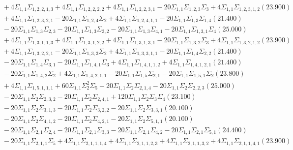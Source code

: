 \documentclass[12pt]{article}
\begin{document}
\begin{landscape}
\begin{align*}
		&\quad\quad +4\Sigma_{1,1}\Sigma_{1,2,2,1,3}+4\Sigma_{1,1}\Sigma_{1,2,2,2,2}+4\Sigma_{1,1}\Sigma_{1,2,2,3,1}-20\Sigma_{1,1}\Sigma_{1,2,3}\Sigma_{3}+4\Sigma_{1,1}\Sigma_{1,2,3,1,2}(23.900) \\ 
		&\quad\quad +4\Sigma_{1,1}\Sigma_{1,2,3,2,1}-20\Sigma_{1,1}\Sigma_{1,2,4}\Sigma_{2}+4\Sigma_{1,1}\Sigma_{1,2,4,1,1}-20\Sigma_{1,1}\Sigma_{1,3}\Sigma_{1,4}(21.400) \\ 
		&\quad\quad -20\Sigma_{1,1}\Sigma_{1,3}\Sigma_{2,3}-20\Sigma_{1,1}\Sigma_{1,3}\Sigma_{3,2}-20\Sigma_{1,1}\Sigma_{1,3}\Sigma_{4,1}-20\Sigma_{1,1}\Sigma_{1,3,1}\Sigma_{4}(25.000) \\ 
		&\quad\quad +4\Sigma_{1,1}\Sigma_{1,3,1,1,3}+4\Sigma_{1,1}\Sigma_{1,3,1,2,2}+4\Sigma_{1,1}\Sigma_{1,3,1,3,1}-20\Sigma_{1,1}\Sigma_{1,3,2}\Sigma_{3}+4\Sigma_{1,1}\Sigma_{1,3,2,1,2}(23.900) \\ 
		&\quad\quad +4\Sigma_{1,1}\Sigma_{1,3,2,2,1}-20\Sigma_{1,1}\Sigma_{1,3,3}\Sigma_{2}+4\Sigma_{1,1}\Sigma_{1,3,3,1,1}-20\Sigma_{1,1}\Sigma_{1,4}\Sigma_{2,2}(21.400) \\ 
		&\quad\quad -20\Sigma_{1,1}\Sigma_{1,4}\Sigma_{3,1}-20\Sigma_{1,1}\Sigma_{1,4,1}\Sigma_{3}+4\Sigma_{1,1}\Sigma_{1,4,1,1,2}+4\Sigma_{1,1}\Sigma_{1,4,1,2,1}(21.400) \\ 
		&\quad\quad -20\Sigma_{1,1}\Sigma_{1,4,2}\Sigma_{2}+4\Sigma_{1,1}\Sigma_{1,4,2,1,1}-20\Sigma_{1,1}\Sigma_{1,5}\Sigma_{2,1}-20\Sigma_{1,1}\Sigma_{1,5,1}\Sigma_{2}(23.800) \\ 
		&\quad\quad +4\Sigma_{1,1}\Sigma_{1,5,1,1,1}+60\Sigma_{1,1}\Sigma_{2}^{2}\Sigma_{5}-20\Sigma_{1,1}\Sigma_{2}\Sigma_{2,1,4}-20\Sigma_{1,1}\Sigma_{2}\Sigma_{2,2,3}(25.000) \\ 
		&\quad\quad -20\Sigma_{1,1}\Sigma_{2}\Sigma_{2,3,2}-20\Sigma_{1,1}\Sigma_{2}\Sigma_{2,4,1}+120\Sigma_{1,1}\Sigma_{2}\Sigma_{3}\Sigma_{4}(23.100) \\ 
		&\quad\quad -20\Sigma_{1,1}\Sigma_{2}\Sigma_{3,1,3}-20\Sigma_{1,1}\Sigma_{2}\Sigma_{3,2,2}-20\Sigma_{1,1}\Sigma_{2}\Sigma_{3,3,1}(20.100) \\ 
		&\quad\quad -20\Sigma_{1,1}\Sigma_{2}\Sigma_{4,1,2}-20\Sigma_{1,1}\Sigma_{2}\Sigma_{4,2,1}-20\Sigma_{1,1}\Sigma_{2}\Sigma_{5,1,1}(20.100) \\ 
		&\quad\quad -20\Sigma_{1,1}\Sigma_{2,1}\Sigma_{2,4}-20\Sigma_{1,1}\Sigma_{2,1}\Sigma_{3,3}-20\Sigma_{1,1}\Sigma_{2,1}\Sigma_{4,2}-20\Sigma_{1,1}\Sigma_{2,1}\Sigma_{5,1}(24.400) \\ 
		&\quad\quad -20\Sigma_{1,1}\Sigma_{2,1,1}\Sigma_{5}+4\Sigma_{1,1}\Sigma_{2,1,1,1,4}+4\Sigma_{1,1}\Sigma_{2,1,1,2,3}+4\Sigma_{1,1}\Sigma_{2,1,1,3,2}+4\Sigma_{1,1}\Sigma_{2,1,1,4,1}(23.900) \\ 

\end{align*}
\end{landscape}
\end{document}
